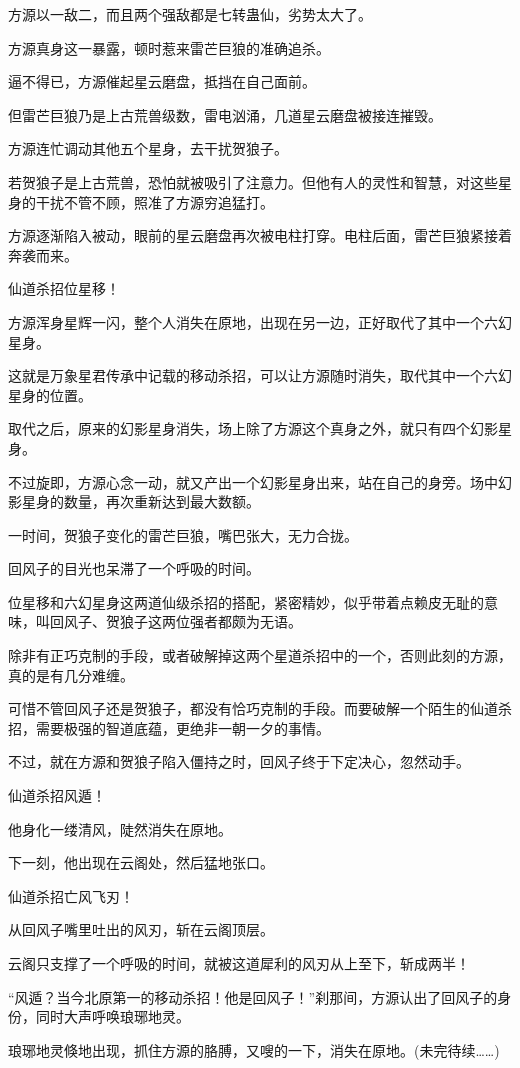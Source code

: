 \begin{this_body}
方源以一敌二，而且两个强敌都是七转蛊仙，劣势太大了。

方源真身这一暴露，顿时惹来雷芒巨狼的准确追杀。

逼不得已，方源催起星云磨盘，抵挡在自己面前。

但雷芒巨狼乃是上古荒兽级数，雷电汹涌，几道星云磨盘被接连摧毁。

方源连忙调动其他五个星身，去干扰贺狼子。

若贺狼子是上古荒兽，恐怕就被吸引了注意力。但他有人的灵性和智慧，对这些星身的干扰不管不顾，照准了方源穷追猛打。

方源逐渐陷入被动，眼前的星云磨盘再次被电柱打穿。电柱后面，雷芒巨狼紧接着奔袭而来。

仙道杀招位星移！

方源浑身星辉一闪，整个人消失在原地，出现在另一边，正好取代了其中一个六幻星身。

这就是万象星君传承中记载的移动杀招，可以让方源随时消失，取代其中一个六幻星身的位置。

取代之后，原来的幻影星身消失，场上除了方源这个真身之外，就只有四个幻影星身。

不过旋即，方源心念一动，就又产出一个幻影星身出来，站在自己的身旁。场中幻影星身的数量，再次重新达到最大数额。

一时间，贺狼子变化的雷芒巨狼，嘴巴张大，无力合拢。

回风子的目光也呆滞了一个呼吸的时间。

位星移和六幻星身这两道仙级杀招的搭配，紧密精妙，似乎带着点赖皮无耻的意味，叫回风子、贺狼子这两位强者都颇为无语。

除非有正巧克制的手段，或者破解掉这两个星道杀招中的一个，否则此刻的方源，真的是有几分难缠。

可惜不管回风子还是贺狼子，都没有恰巧克制的手段。而要破解一个陌生的仙道杀招，需要极强的智道底蕴，更绝非一朝一夕的事情。

不过，就在方源和贺狼子陷入僵持之时，回风子终于下定决心，忽然动手。

仙道杀招风遁！

他身化一缕清风，陡然消失在原地。

下一刻，他出现在云阁处，然后猛地张口。

仙道杀招亡风飞刃！

从回风子嘴里吐出的风刃，斩在云阁顶层。

云阁只支撑了一个呼吸的时间，就被这道犀利的风刃从上至下，斩成两半！

“风遁？当今北原第一的移动杀招！他是回风子！”刹那间，方源认出了回风子的身份，同时大声呼唤琅琊地灵。

琅琊地灵倏地出现，抓住方源的胳膊，又嗖的一下，消失在原地。(未完待续……)

\end{this_body}

